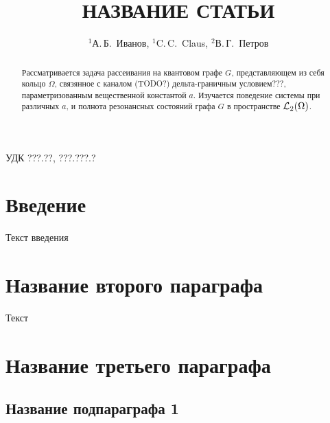 \documentclass{nsart_eng}
\begin{document}
\title[короткое название статьи]
{НАЗВАНИЕ СТАТЬИ}

\author[А.\,Б.~Иванов, C.\,C.~Claus, В.\,Г.~Петров]
{$^1$А.\,Б.~Иванов, $^{1}$C.\,C.~Claus, $^2$В.\,Г.~Петров}

\address{
$^1$ Санкт-Петербургский Национальный Исследовательский Университет Информационных Технологий, \\
Механики и Оптики,\\
Кронверкский пр., 49, Санкт-Петербург, 197101, Россия\\
$^2$ Swiss Federal University of Technology,\\
Sonneggstrasse, 5,  Zurich, CH-8092, Switzerland }


УДК ???.??, ???.???.?%

\begin{abstract}
Рассматривается задача рассеивания на квантовом графе $G$, представляющем из себя кольцо $\Omega$, связянное с каналом (TODO?) дельта-граничным условием???, параметризованным вещественной константой $a$. Изучается поведение системы при различных $a$, и полнота резонансных состояний графа $G$ в пространстве $\mathcal{L}_2(\Omega)$.
\end{abstract}


\maketitle

\section{Введение}

Текст введения

\section{Название второго параграфа}
Текст

\section{Название третьего параграфа}

\subsection{Название подпараграфа 1}
\end{document}
